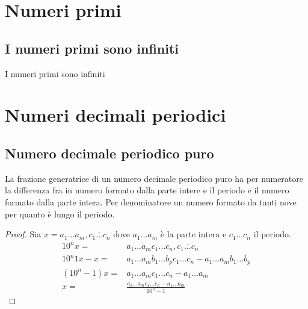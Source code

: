 \chapter{Numeri primi}\label{ch:numeri-primi}
\section{I numeri primi sono infiniti}\label{sec:i-numeri-primi}
\begin{thm}\label{thm:numeriprimiinfiniti1}
I numeri primi sono infiniti
\end{thm}
\chapter{Numeri decimali periodici}\label{ch:numeri-decimali-periodici}
\section{Numero decimale periodico puro}\label{sec:numerodecimaleperiodico-puro}
\begin{thm}
	La frazione generatrice di un numero decimale periodico puro ha per numeratore la differenza fra in numero formato dalla parte intere e il periodo e il numero formato dalla parte intera. Per denominatore un numero formato da tanti nove per quanto è lungo il periodo.  
\end{thm}
\begin{proof}
	Sia $x=a_1\dots a_m,\overline{c_1\dots c_n}$ dove $a_1\dots a_m$ è la parte intera e $c_1\dots c_n$ il periodo. 
	\begin{align*}
	10^nx=&a_1\dots a_m c_1\dots c_n,\overline{c_1\dots c_n}\\
	10^n1x-x=&a_1\dots a_m b_1\dots b_p c_1\dots c_n-a_1\dots a_m b_1\dots b_p\\
	(10^n-1)x=&a_1\dots a_m c_1\dots c_n-a_1\dots a_m\\
	x=&\frac{a_1\dots a_m c_1\dots c_n-a_1\dots a_m}{10^n-1}
	\end{align*}
\end{proof}
